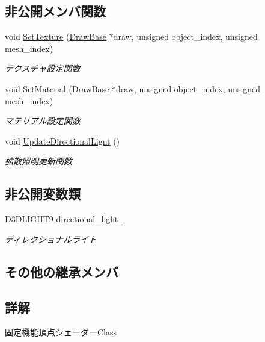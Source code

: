\subsection*{非公開メンバ関数}
\begin{DoxyCompactItemize}
\item 
void \mbox{\hyperlink{class_vertex_shader_fixed_a1caad0cf4c86788ed17c2a8da8645414}{Set\+Texture}} (\mbox{\hyperlink{class_draw_base}{Draw\+Base}} $\ast$draw, unsigned object\+\_\+index, unsigned mesh\+\_\+index)
\begin{DoxyCompactList}\small\item\em テクスチャ設定関数 \end{DoxyCompactList}\item 
void \mbox{\hyperlink{class_vertex_shader_fixed_a05ce5fdd8ff190b9934497f42cf19a38}{Set\+Material}} (\mbox{\hyperlink{class_draw_base}{Draw\+Base}} $\ast$draw, unsigned object\+\_\+index, unsigned mesh\+\_\+index)
\begin{DoxyCompactList}\small\item\em マテリアル設定関数 \end{DoxyCompactList}\item 
void \mbox{\hyperlink{class_vertex_shader_fixed_ae15e2c1ce81ca57cf657a6edff36cf9c}{Update\+Directional\+Lignt}} ()
\begin{DoxyCompactList}\small\item\em 拡散照明更新関数 \end{DoxyCompactList}\end{DoxyCompactItemize}
\subsection*{非公開変数類}
\begin{DoxyCompactItemize}
\item 
D3\+D\+L\+I\+G\+H\+T9 \mbox{\hyperlink{class_vertex_shader_fixed_ae2409965de90816f89ba8797880b3cd2}{directional\+\_\+light\+\_\+}}
\begin{DoxyCompactList}\small\item\em ディレクショナルライト \end{DoxyCompactList}\end{DoxyCompactItemize}
\subsection*{その他の継承メンバ}


\subsection{詳解}
固定機能頂点シェーダー\+Class 

